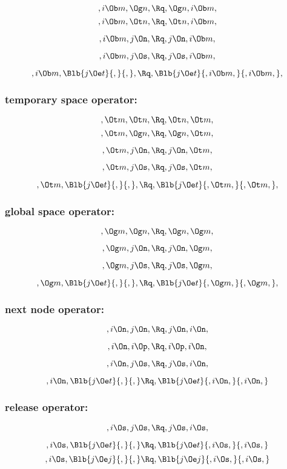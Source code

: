 \[,i \Ob m,  \Og n, \Rq , \Og n, i \Ob m,\]
\[,i \Ob m,  \Ot n, \Rq , \Ot n, i \Ob m,\]

\[,i \Ob m, j \On, \Rq , j \On, i \Ob m,\]

\[,i \Ob m, j \Os, \Rq , j \Os, i \Ob m,\]

\[,i \Ob m, \Blb{j \Oe t}{,}{,}, \Rq , \Blb{j \Oe t}{,i \Ob m,}{,i \Ob m,},\]

\bigskip
\subsubsection{temporary space operator:}
\[, \Ot m,  \Ot n, \Rq , \Ot n, \Ot m,\]
\[, \Ot m,  \Og n, \Rq , \Og n, \Ot m,\]

\[, \Ot m, j \On, \Rq , j \On,  \Ot m,\]

\[, \Ot m, j \Os, \Rq , j \Os,  \Ot m,\]

\[, \Ot m, \Blb{j \Oe t}{,}{,}, \Rq , \Blb{j \Oe t}{, \Ot m,}{, \Ot m,},\]


\bigskip
\subsubsection{global space operator:}
\[, \Og m,  \Og n, \Rq , \Og n, \Og m,\]

\[, \Og m, j \On, \Rq , j \On,  \Og m,\]

\[, \Og m, j \Os, \Rq , j \Os,  \Og m,\]

\[, \Og m, \Blb{j \Oe t}{,}{,}, \Rq , \Blb{j \Oe t}{, \Og m,}{, \Og m,},\]


\bigskip
\subsubsection{next node operator:}

\[,i \On, j \On, \Rq , j \On, i \On,\]

\[,i \On, i \Op, \Rq , i \Op, i \On,\]

\[,i \On, j \Os, \Rq , j \Os,i \On,\]

\[,i \On, \Blb{j \Oe t}{,}{,} \Rq , \Blb{j \Oe t}{,i \On,}{,i \On,}\]



\bigskip
\subsubsection{release operator:}

\[,i \Os, j \Os, \Rq , j \Os,i \Os,\]

\[,i \Os, \Blb{j \Oe t}{,}{,} \Rq , \Blb{j \Oe t}{,i \Os,}{,i \Os,}\]
\[,i \Os, \Blb{j \Oe j}{,}{,} \Rq , \Blb{j \Oe j}{,i \Os,}{,i \Os,}\]

